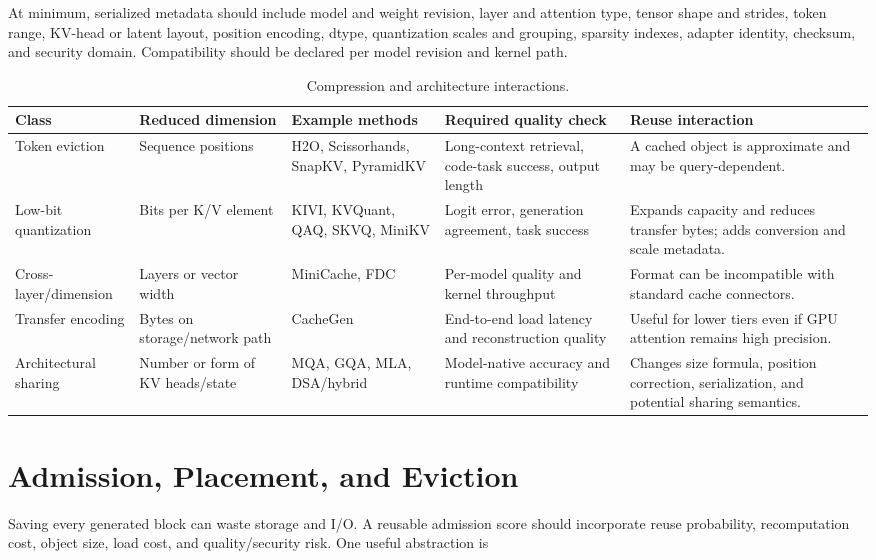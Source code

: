 \documentclass[conference,10pt]{IEEEtran}
\begin{document}
At minimum, serialized metadata should include model and weight revision, layer and attention type, tensor shape and strides, token range, KV-head or latent layout, position encoding, dtype, quantization scales and grouping, sparsity indexes, adapter identity, checksum, and security domain. Compatibility should be declared per model revision and kernel path.

\begin{table}[t]
\caption{Compression and architecture interactions.}
\label{tab:compression}
\centering
\small
\begin{tabularx}{\textwidth}{p{}p{}p{}p{}Y}
\toprule
Class & Reduced dimension & Example methods & Required quality check & Reuse interaction \\
\midrule
Token eviction & Sequence positions & H2O, Scissorhands, SnapKV, PyramidKV & Long-context retrieval, code-task success, output length & A cached object is approximate and may be query-dependent. \\
Low-bit quantization & Bits per K/V element & KIVI, KVQuant, QAQ, SKVQ, MiniKV & Logit error, generation agreement, task success & Expands capacity and reduces transfer bytes; adds conversion and scale metadata. \\
Cross-layer/dimension & Layers or vector width & MiniCache, FDC & Per-model quality and kernel throughput & Format can be incompatible with standard cache connectors. \\
Transfer encoding & Bytes on storage/network path & CacheGen & End-to-end load latency and reconstruction quality & Useful for lower tiers even if GPU attention remains high precision. \\
Architectural sharing & Number or form of KV heads/state & MQA, GQA, MLA, DSA/hybrid & Model-native accuracy and runtime compatibility & Changes size formula, position correction, serialization, and potential sharing semantics. \\
\bottomrule
\end{tabularx}
\end{table}

\section{Admission, Placement, and Eviction}

Saving every generated block can waste storage and I/O. A reusable admission score should incorporate reuse probability, recomputation cost, object size, load cost, and quality/security risk. One useful abstraction is
\end{document}
